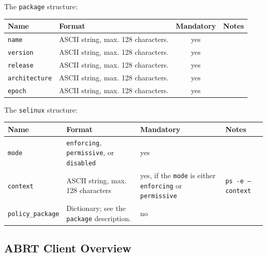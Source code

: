 \documentclass{article}
\begin{document}
The \texttt{package} structure:

\begin{center}
\begin{tabular}{l|p{5cm}|c|p{5cm}}
\hline
Name & Format & Mandatory & Notes \\ \hline
\texttt{name} & ASCII string, max. 128 characters. & yes & \\
\texttt{version} & ASCII string, max. 128 characters. & yes & \\
\texttt{release} & ASCII string, max. 128 characters. & yes & \\
\texttt{architecture} & ASCII string, max. 128 characters. & yes & \\
\texttt{epoch} & ASCII string, max. 128 characters. & yes & \\
\hline
\end{tabular}
\end{center}

The \texttt{selinux} structure:
\begin{center}
\begin{tabular}{l|p{5cm}|p{3cm}|p{5cm}}
\hline
Name & Format & Mandatory & Notes \\ \hline
\texttt{mode} & \texttt{enforcing}, \texttt{permissive}, or \texttt{disabled} & yes & \\
\texttt{context} & ASCII string, max. 128 characters & yes, if the \texttt{mode} is either \texttt{enforcing} or \texttt{permissive} & \texttt{ps -e --context} \\
\texttt{policy\_package} & Dictionary; see the \texttt{package} description. & no & \\
\hline
\end{tabular}
\end{center}


\subsection{ABRT Client Overview}
\end{document}
